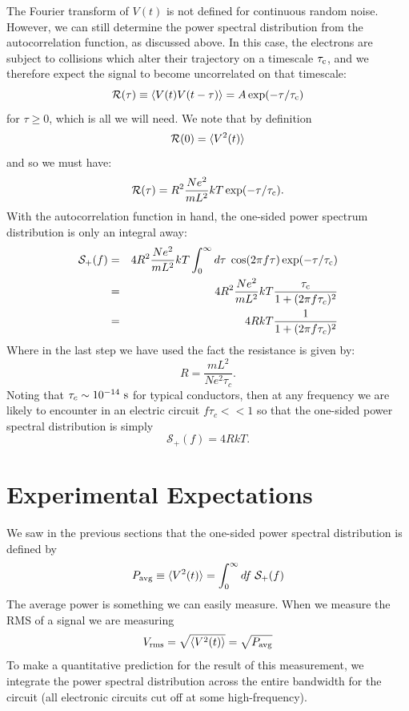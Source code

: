 \documentclass[12pt]{article}
\begin{document}
The Fourier transform of $V(t)$ is not defined for continuous random noise.  However, we can still determine the power spectral distribution from the autocorrelation function, as discussed above.  In this case, the electrons are subject to collisions which alter their trajectory on a timescale $\tau_{\rm c}$, and we therefore expect the signal to become uncorrelated on that timescale:
\begin{displaymath}
\mathcal{R}(\tau) \equiv \braket{V(t) V(t-\tau)} =  A \exp(-\tau/\tau_{\rm c})
\end{displaymath} 
for $\tau \geq 0$, which is all we will need.  We note that by definition
\begin{displaymath}
\mathcal{R}(0) = \braket{V^2(t)} 
\end{displaymath}
and so we must have:
\begin{displaymath}
\mathcal{R}(\tau) = R^2 \frac{N e^2}{m L^2} kT \exp(-\tau/\tau_{\rm c}).
\end{displaymath} 
With the autocorrelation function in hand, the one-sided power spectrum distribution is only an integral away:
\begin{eqnarray*}
\mathcal{S}_{+}(f) &=& 4R^2 \frac{N e^2}{m L^2} kT \int_0^{\infty}d\tau \;\cos(2\pi f \tau) \exp(-\tau/\tau_{\rm c})\\
 &=& 4R^2 \frac{N e^2}{m L^2} kT \frac{\tau_{\rm c}}{1+(2 \pi f \tau_c)^2} \\
 &=& 4R kT \frac{1}{1+(2 \pi f \tau_c)^2} \\
\end{eqnarray*} 
Where in the last step we have used the fact the resistance is given by:
\begin{displaymath}
R = \frac{m L^2}{N e^2 \tau_c}.
\end{displaymath}
Noting that $\tau_c \sim 10^{-14}~\rm s$ for typical conductors, then at any frequency we are likely to encounter in an electric circuit $f \tau_c << 1$ so that the one-sided power spectral distribution is simply
\begin{equation}
\mathcal{S}_{+}(f) = 4 R k T.
\end{equation}

\section{Experimental Expectations}

We saw in the previous sections that the one-sided power spectral distribution is defined by
\begin{equation}
P_{\rm avg} \equiv \braket{V^2(t)} = \int_{0}^{\infty} df \; \mathcal{S}_+(f) 
\end{equation}
The average power is something we can easily measure.  When we measure the RMS of a signal we are measuring 
\begin{displaymath}
V_{\rm rms} = \sqrt{\braket{V^2(t)}} = \sqrt{P_{\rm avg}}
\end{displaymath}
To make a quantitative prediction for the result of this measurement, we integrate the power spectral distribution across the entire bandwidth for the circuit (all electronic circuits cut off at some high-frequency).
\end{document}
